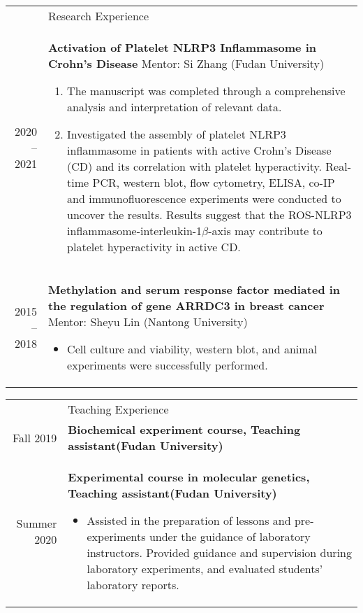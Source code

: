 \documentclass[letterpaper, 11pt]{article}
\newcommand{\headingfont}{\Large\color{LimeGreen}}
\newenvironment{SectionTable}[1]{
	\renewcommand*{\arraystretch}{1.7}
	\setlength{\tabcolsep}{10pt}
	\begin{longtable}{Rp{5.2in}} & #1 \\}
{\end{longtable}\vspace{-.3cm}}
\begin{document}
\begin{SectionTable}{\headingfont Research Experience}
2020 -- 2021 &
\textbf{Activation of Platelet NLRP3 Inflammasome in Crohn's Disease} \newline
Mentor: Si Zhang (Fudan University) 
\begin{enumerate}
	\item The manuscript was completed through a comprehensive analysis and interpretation of relevant data.
	\item Investigated the assembly of platelet NLRP3 inflammasome in patients with active Crohn's Disease (CD) and its correlation with platelet hyperactivity. Real-time PCR, western blot, flow cytometry, ELISA, co-IP and immunofluorescence experiments were conducted to uncover the results. Results suggest that the ROS-NLRP3 inflammasome-interleukin-1$\beta$-axis may contribute to platelet hyperactivity in active CD. 
\end{enumerate}  \\

2015 -- 2018 &
\textbf{Methylation and serum response factor mediated in the regulation of gene ARRDC3 in breast cancer} \newline
Mentor: Sheyu Lin (Nantong University)
\begin{itemize}
	\item Cell culture and viability, western blot, and animal experiments were successfully performed.
\end{itemize}
\end{SectionTable}


\begin{SectionTable}{\headingfont Teaching Experience}
Fall 2019 & 
\textbf{Biochemical experiment course, Teaching assistant(Fudan University)} \\

Summer  2020 & 
\textbf{Experimental course in molecular genetics, Teaching assistant(Fudan University)}
\begin{itemize}
	\item Assisted in the preparation of lessons and pre-experiments under the guidance of laboratory instructors. Provided guidance and supervision during laboratory experiments, and evaluated students' laboratory reports. 
\end{itemize}
\end{SectionTable}

\end{document}
